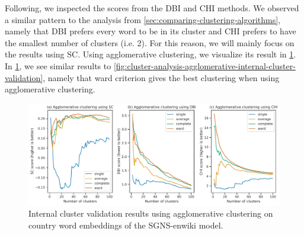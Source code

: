 Following, we inspected the scores from the DBI and CHI methods. We observed a similar pattern to the analysis from \cref{sec:comparing-clustering-algorithms}, namely that DBI prefers every word to be in its cluster and CHI prefers to have the smallest number of clusters (i.e. 2). For this reason, we will mainly focus on the results using SC. Using agglomerative clustering, we visualize its result in \cref{fig:cluster-analysis-agglomerative-country-word-group-internal-cluster-validation}. In \cref{fig:cluster-analysis-agglomerative-country-word-group-internal-cluster-validation}, we see similar results to \cref{fig:cluster-analysis-agglomerative-internal-cluster-validation}, namely that ward criterion gives the best clustering when using agglomerative clustering.
\begin{figure}[H]
    \centering
    \includegraphics[width=\textwidth]{thesis/figures/cluster-analysis-agglomerative-country-word-group-internal-cluster-validation.pdf}
    \caption{Internal cluster validation results using agglomerative clustering on country word embeddings of the SGNS-enwiki model.}
    \label{fig:cluster-analysis-agglomerative-country-word-group-internal-cluster-validation}
\end{figure}


